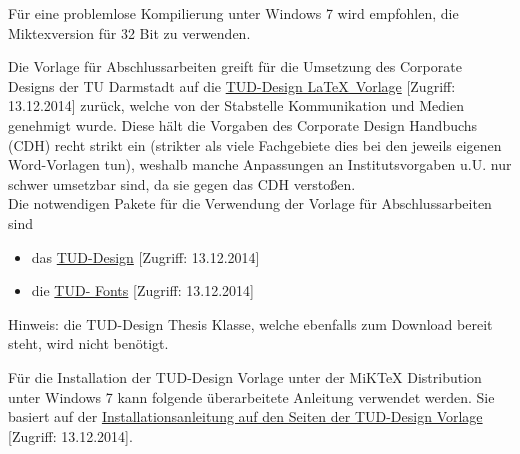 Für eine problemlose Kompilierung unter Windows 7 wird empfohlen, die Miktexversion für 32 Bit zu verwenden.

Die Vorlage für Abschlussarbeiten greift für die Umsetzung des Corporate Designs der TU Darmstadt auf die \href{http://exp1.fkp.physik.tu-darmstadt.de/tuddesign/}{TUD-Design \LaTeX\ Vorlage} [Zugriff: 13.12.2014] zurück, welche von der Stabstelle Kommunikation und Medien genehmigt wurde. Diese hält die Vorgaben des Corporate Design Handbuchs (CDH) recht strikt ein (strikter als viele Fachgebiete dies bei den jeweils eigenen Word-Vorlagen tun), weshalb manche Anpassungen an Institutsvorgaben u.U. nur schwer umsetzbar sind, da sie gegen das CDH verstoßen.\\
Die notwendigen Pakete für die Verwendung der Vorlage für Abschlussarbeiten sind
\begin{itemize}
	\item das \href{http://exp1.fkp.physik.tu-darmstadt.de/tuddesign/latex/latex-tuddesign/latex-tuddesign_0.0.20100410.zip}{TUD-Design} [Zugriff: 13.12.2014]
	\item die \href{http://exp1.fkp.physik.tu-darmstadt.de/tuddesign/latex/tudfonts-tex/tudfonts-tex_0.0.20090806.zip}{TUD- Fonts} [Zugriff: 13.12.2014]
\end{itemize}
Hinweis: die TUD-Design Thesis Klasse, welche ebenfalls zum Download bereit steht, wird nicht benötigt.

Für die Installation der TUD-Design Vorlage unter der MiKTeX Distribution unter Windows 7 kann folgende überarbeitete Anleitung verwendet werden. Sie basiert auf der \href{http://exp1.fkp.physik.tu-darmstadt.de/tuddesign/Win7_miktex29.html}{Installationsanleitung auf den Seiten der TUD-Design Vorlage} [Zugriff: 13.12.2014].

